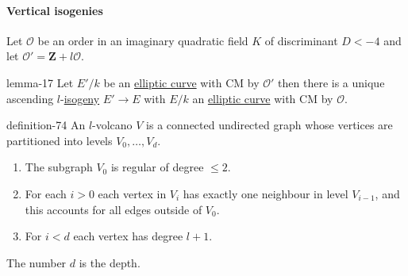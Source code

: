 \documentclass[10pt,]{book}
\numberwithin{equation}{section}
\newcommand{\ZZ}{\mathbf{Z}}
\newcommand{\ints}{\mathcal{O}}
\newcommand{\lt}{<}
\newcommand{\gt}{>}
\begin{document}
\paragraph[{Vertical isogenies}]{Vertical isogenies}\hypertarget{paragraphs-28}{}
\hypertarget{p-814}{}%
Let \(\ints\) be an order in an imaginary quadratic field \(K \) of discriminant \(D \lt -4\) and let \(\ints' = \ZZ+l\ints\).%
\begin{lemma}{}{}{lemma-17}%
\hypertarget{p-815}{}%
Let \(E' / k\)  be an \hyperref[def-supersing-isog-ec]{elliptic curve} with CM by \(\ints '\) then there is a  unique ascending \(l\)-\hyperref[def-supersing-isog-isog]{isogeny} \(E'\to E\) with \(E/k\) an \hyperref[def-supersing-isog-ec]{elliptic curve} with CM by \(\ints\).%
\end{lemma}
\begin{definition}{}{definition-74}%
\hypertarget{p-816}{}%
An \(l\)-volcano \(V\) is a connected undirected graph whose vertices are partitioned into levels \(V_0, \ldots, V_d\).\leavevmode%
\begin{enumerate}
\item\hypertarget{li-198}{}The subgraph \(V_0\) is regular of degree \(\le 2\).%
\item\hypertarget{li-199}{}For each \(i \gt 0\) each vertex in \(V_i\) has exactly one neighbour in level \(V_{i-1}\), and this accounts for all edges outside of \(V_0\).%
\item\hypertarget{li-200}{}For \(i \lt d\) each vertex has degree \(l+1\).%
\end{enumerate}
The number \(d\) is the depth.%
\end{definition}
\end{document}

